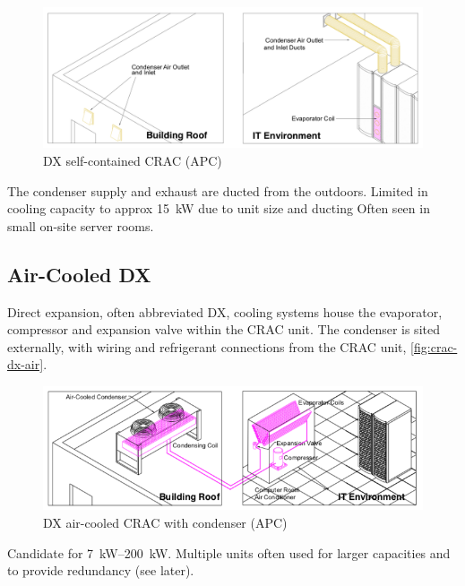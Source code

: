 \documentclass{pgnotes}
\begin{document}
\begin{figure}[hptb]
  \centering
  \includegraphics[width=1.0\linewidth]{crac_self_contained_schematic}
  \caption{DX self-contained CRAC (APC)}
  \label{fig:crac-dx-self-contained}
\end{figure}

The condenser supply and exhaust are ducted from the outdoors.
Limited in cooling capacity to approx \SI{15}{\kilo\watt} due to unit size and ducting
Often seen in small on-site server rooms.


\subsection{Air-Cooled DX}
\label{sec:air-cooled-dx}

Direct expansion, often abbreviated DX, cooling systems house the evaporator, compressor and expansion valve within the CRAC unit.
The condenser is sited externally, with wiring and refrigerant connections from the CRAC unit, \autoref{fig:crac-dx-air}.

\begin{figure}[hptb]
  \centering
  \includegraphics[width=1.0\linewidth]{crac_dx_air_schematic}
  \caption{DX air-cooled CRAC with condenser (APC)}
  \label{fig:crac-dx-air}
\end{figure}

Candidate for \SIrange{7}{200}{\kilo\watt}.
Multiple units often used for larger capacities and to provide redundancy (see later).

\end{document}
